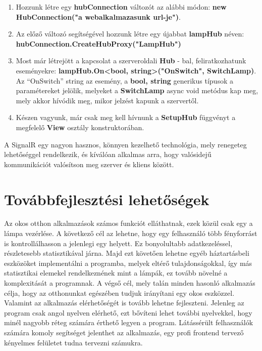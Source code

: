 \documentclass[a4paper,12pt]{report}
\begin{document}
\begin{enumerate}
    \item Hozzunk létre egy \textbf{hubConnection} változót az alábbi módon: \textbf{new HubConnection("a webalkalmazasunk url-je")}.
    \item Az előző változó segítségével hozzunk létre egy újabbat \textbf{lampHub} néven: \textbf{hubConnection.CreateHubProxy("LampHub")}
    \item Most már létrejött a kapcsolat a szerveroldali \textbf{Hub} - bal, feliratkozhatunk eseményekre: \textbf{lampHub.On<bool, string>("OnSwitch", SwitchLamp)}.
    Az ``OnSwitch'' string az esemény, a \textbf{bool, string} generikus típusok a paramétereket jelölik, melyeket a \textbf{SwitchLamp}
    async void metódus kap meg, mely akkor hívódik meg, mikor jelzést kapunk a szervertől.
    \item Készen vagyunk, már csak meg kell hívnunk a \textbf{SetupHub} függvényt a megfelelő \textbf{View} osztály konstruktorában.
\end{enumerate}

    A SignalR egy nagyon hasznos, könnyen kezelhető technológia, mely renegeteg lehetőséggel rendelkezik, és kíválóan alkalmas
    arra, hogy valósidejű kommunikációt valósítson meg szerver és kliens között.

\section{Továbbfejlesztési lehetőségek}
    Az okos otthon alkalmazások számos funkciót elláthatnak, ezek közül csak egy a lámpa vezérlése. A következő cél az lehetne,
    hogy egy felhasználó több fényforrást is kontrollálhasson a jelenlegi egy helyett. Ez bonyolultabb adatkezeléssel, részletesebb statisztikával
    járna. Majd ezt követően lehetne egyéb háztartásbeli eszközöket implementálni a programba, melyek eltérő tulajdonságokkal, így
    más statisztikai elemekel rendelkeznének mint a lámpák, ez tovább növelné a komplexitását a programnak. A végső cél, mely
    talán minden hasonló alkalmazás célja, hogy az otthonunkat egészében tudjuk irányítani egy okos eszközzel.\\

    Valamint az alkalmazás elérhetőségét is tovább lehetne fejleszteni. Jelenleg az program csak angol nyelven elérhető, ezt bővíteni lehet
    további nyelvekkel, hogy minél nagyobb réteg számára érthető legyen a program. Látássérült felhasználók számára komoly segítséget jelenthet
    az alkalmazás, egy profi frontend tervező kényelmes felületet tudna tervezni számukra.\\
\end{document}
